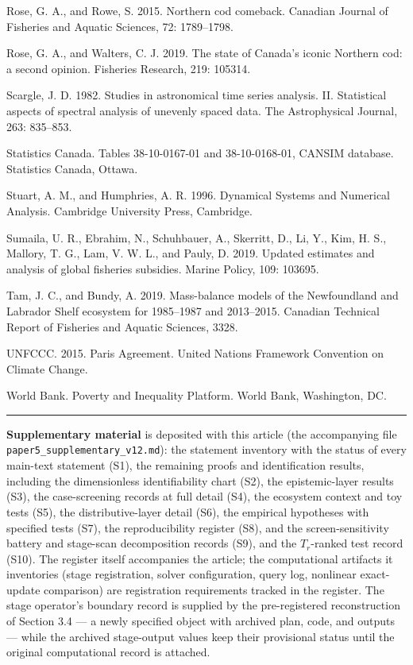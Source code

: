 \documentclass[11pt]{article}
\begin{document}
Rose, G. A., and Rowe, S. 2015. Northern cod comeback. Canadian Journal
of Fisheries and Aquatic Sciences, 72: 1789--1798.

Rose, G. A., and Walters, C. J. 2019. The state of Canada's iconic
Northern cod: a second opinion. Fisheries Research, 219: 105314.

Scargle, J. D. 1982. Studies in astronomical time series analysis. II.
Statistical aspects of spectral analysis of unevenly spaced data. The
Astrophysical Journal, 263: 835--853.

Statistics Canada. Tables 38-10-0167-01 and 38-10-0168-01, CANSIM
database. Statistics Canada, Ottawa.

Stuart, A. M., and Humphries, A. R. 1996. Dynamical Systems and Numerical Analysis. Cambridge University Press, Cambridge.

Sumaila, U. R., Ebrahim, N., Schuhbauer, A., Skerritt, D., Li, Y., Kim, H. S., Mallory, T. G., Lam, V. W. L., and Pauly, D. 2019. Updated estimates and analysis of global fisheries subsidies. Marine Policy, 109: 103695.

Tam, J. C., and Bundy, A. 2019. Mass-balance models of the Newfoundland
and Labrador Shelf ecosystem for 1985--1987 and 2013--2015. Canadian
Technical Report of Fisheries and Aquatic Sciences, 3328.

UNFCCC. 2015. Paris Agreement. United Nations Framework Convention on Climate Change.

World Bank. Poverty and Inequality Platform. World Bank, Washington, DC.

\begin{center}\rule{0.5\linewidth}{0.5pt}\end{center}

\textbf{Supplementary material} is deposited with this article (the
accompanying file \texttt{paper5\_supplementary\_v12.md}): the statement
inventory with the status of every main-text statement (S1), the
remaining proofs and identification results, including the dimensionless
identifiability chart (S2), the epistemic-layer results (S3), the
case-screening records at full detail (S4), the ecosystem context and
toy tests (S5), the distributive-layer detail (S6), the empirical
hypotheses with specified tests (S7), the reproducibility register
(S8), and the screen-sensitivity battery and stage-scan decomposition
records (S9), and the \(T_r\)-ranked test record (S10). The register itself accompanies the article; the computational
artifacts it inventories (stage registration, solver configuration,
query log, nonlinear exact-update comparison) are registration
requirements tracked in the register. The stage operator's boundary
record is supplied by the pre-registered reconstruction of
Section 3.4 --- a newly specified object with archived plan, code, and
outputs --- while the archived stage-output values keep their
provisional status until the original computational record is attached.
\end{document}
